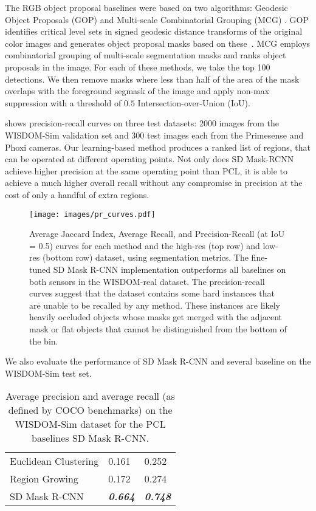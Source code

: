 \documentclass[letterpaper, 10 pt, conference]{ieeeconf}  \pdfoutput=1
\numberwithin{equation}{section}
\begin{document}
The RGB object proposal baselines were based on two algorithms: Geodesic Object Proposals (GOP) \cite{krahenbuhl2014geodesic} and Multi-scale Combinatorial Grouping (MCG) \cite{arbelaez2014multiscale}. GOP identifies critical level sets in signed geodesic distance transforms of the original color images and generates object proposal masks based on these~\cite{krahenbuhl2014geodesic}. MCG employs combinatorial grouping of multi-scale segmentation masks and ranks object proposals in the image. For each of these methods, we take the top 100 detections. We then remove masks where less than half of the area of the mask overlaps with the foreground segmask of the image and apply non-max suppression with a threshold of $0.5$ Intersection-over-Union (IoU).


 shows precision-recall curves on three test datasets: 2000 images from the WISDOM-Sim validation set and 300 test images each from the Primesense and Phoxi cameras. Our learning-based method produces a ranked list of regions, that can be operated at different operating points.
Not only does SD Mask-RCNN achieve higher precision at the same operating point than PCL, it is able to achieve a much higher overall recall without any compromise in precision at the cost of only a handful of extra regions. 

\begin{figure*}[t!]
    \centering
    \texttt{[image: images/pr\_curves.pdf]}
    \caption{Average Jaccard Index, Average Recall, and Precision-Recall (at IoU = 0.5) curves for each method and the high-res (top row) and low-res (bottom row) dataset, using segmentation metrics. The fine-tuned SD Mask R-CNN implementation outperforms all baselines on both sensors in the WISDOM-real dataset. The precision-recall curves suggest that the dataset contains some hard instances that are unable to be recalled by any method. These instances are likely heavily occluded objects whose masks get merged with the adjacent mask or flat objects that cannot be distinguished from the bottom of the bin.}
\end{figure*}

We also evaluate the performance of SD Mask R-CNN and several baseline on the WISDOM-Sim test set.

\begin{table}[t!]
    \setlength\tabcolsep{4pt}
    \begin{tabularx}{\linewidth}{*{1}{l}*{2}{Z}}
        \toprule
          &  &  \\\midrule
        Euclidean Clustering    & 0.161 & 0.252 \\
        Region Growing          & 0.172 & 0.274 \\
        SD Mask R-CNN           & \textit{\textbf{0.664}} & \textit{\textbf{0.748}} \\
        \bottomrule
    \end{tabularx}
    \caption{Average precision and average recall (as defined by COCO benchmarks) on the WISDOM-Sim dataset for the PCL baselines SD Mask R-CNN.}
    \label{tab:ap_sim}
\end{table}
\end{document}
